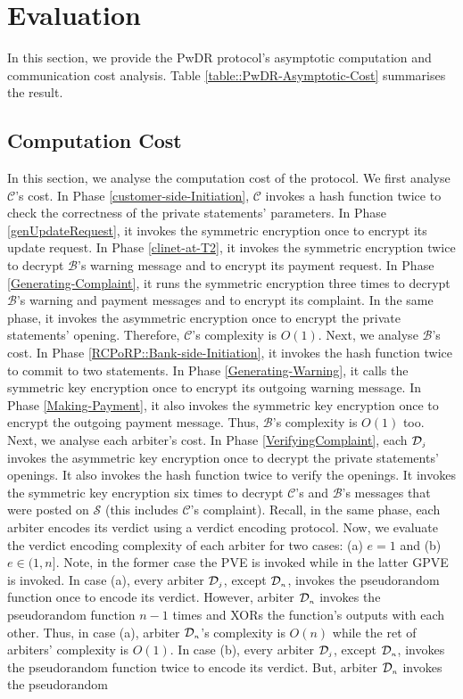 
\section{Evaluation}
In this section, we provide the PwDR protocol’s asymptotic computation and communication cost analysis. Table \ref{table::PwDR-Asymptotic-Cost} summarises the result. 





\subsection{Computation Cost} In this section, we analyse the computation cost of the protocol. We first analyse $\mathcal{C}$'s cost. In Phase \ref{customer-side-Initiation}, $\mathcal{C}$ invokes a hash function twice to check the correctness of the private statements' parameters. In Phase \ref{genUpdateRequest}, it invokes the symmetric encryption once to encrypt its update request. In Phase \ref{clinet-at-T2}, it invokes  the symmetric encryption twice to decrypt $\mathcal{B}$'s warning message and to encrypt its payment request. In Phase \ref{Generating-Complaint}, it runs  the symmetric encryption three times to decrypt $\mathcal{B}$'s warning and payment messages and to encrypt its complaint. In the same phase, it invokes the asymmetric encryption once to encrypt the private statements' opening. Therefore, $\mathcal{C}$'s complexity   is  $O(1)$. Next, we analyse $\mathcal{B}$'s cost. In Phase \ref{RCPoRP::Bank-side-Initiation}, it invokes the hash function twice to commit  to  two statements. In Phase \ref{Generating-Warning}, it calls the symmetric key encryption once to encrypt its outgoing warning message. In Phase \ref{Making-Payment}, it also invokes  the symmetric key encryption once to encrypt the outgoing payment message. Thus, $\mathcal{B}$'s complexity   is  $O(1)$ too. Next, we analyse each arbiter's cost. In Phase \ref{VerifyingComplaint}, each $\mathcal{D}_{\scriptscriptstyle j}$ invokes the asymmetric key encryption once to decrypt the private statements' openings. It also invokes the hash function twice to verify the openings. It invokes the symmetric key encryption six times to decrypt $\mathcal{C}$'s and $\mathcal{B}$'s messages that were posted on $\mathcal{S}$ (this includes $\mathcal{C}$'s complaint). Recall, in the same phase, each arbiter encodes its verdict using a verdict encoding protocol. Now, we evaluate the verdict encoding complexity of each arbiter for two cases: (a)   $e=1$ and (b) $e\in(1, n]$. Note, in the former case the PVE is invoked while in the latter GPVE is invoked. In case (a), every arbiter $\mathcal{D}_{\scriptscriptstyle j}$, except $\mathcal{D}_{\scriptscriptstyle n}$, invokes the pseudorandom function once to encode its verdict. However,  arbiter $\mathcal{D}_{\scriptscriptstyle n}$ invokes the pseudorandom function $n-1$ times and XORs the function's outputs with each other. Thus, in  case (a), arbiter $\mathcal{D}_{\scriptscriptstyle n}$'s complexity is $O(n)$ while the ret of arbiters' complexity is $O(1)$.  In case (b), every arbiter $\mathcal{D}_{\scriptscriptstyle j}$, except $\mathcal{D}_{\scriptscriptstyle n}$, invokes the pseudorandom function twice to encode its verdict.  But,  arbiter $\mathcal{D}_{\scriptscriptstyle n}$ invokes the pseudorandom 